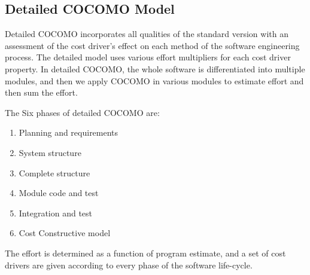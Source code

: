 \subsection{Detailed COCOMO Model}
Detailed COCOMO incorporates all qualities of the standard version with an assessment of the cost driver's effect on each method of the software engineering process. The detailed model uses various effort multipliers for each cost driver property. In detailed COCOMO, the whole software is differentiated into multiple modules, and then we apply COCOMO in various modules to estimate effort and then sum the effort.

The Six phases of detailed COCOMO are:

\begin{enumerate}
 \item Planning and requirements
 \item System structure
 \item Complete structure
 \item Module code and test
 \item Integration and test
 \item Cost Constructive model
\end{enumerate}

The effort is determined as a function of program estimate, and a set of cost drivers are given according to every phase of the software life-cycle.
